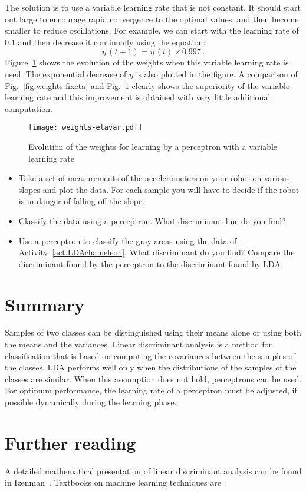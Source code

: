The solution is to use a variable learning rate that is not constant. It should start out large to encourage rapid convergence to the optimal values, and then become smaller to reduce oscillations. For example, we can start with the learning rate of $0.1$ and then decrease it continually using the equation:
\[
\eta\,(t+1) = \eta\,(t) \times 0.997\,.
\]
Figure~\ref{fig.perceptron-dis-etavar} shows the evolution of the weights when this variable learning rate is used. The exponential decrease of $\eta$ is also plotted in the figure. A comparison of Fig.~\ref{fig.weights-fixeta} and Fig.~\ref{fig.perceptron-dis-etavar} clearly shows the superiority of the variable learning rate and this improvement is obtained with very little additional computation.
\begin{figure}
\begin{center}
\texttt{[image: weights-etavar.pdf]}
\end{center}
\caption{Evolution of the weights for learning by a perceptron with a variable learning rate}\label{fig.perceptron-dis-etavar}
\end{figure}

\begin{framed}
\begin{itemize}
\item Take a set of measurements of the accelerometers on your robot on various slopes and plot the data. For each sample you will have to decide if the robot is in danger of falling off the slope.
\item Classify the data using a perceptron. What discriminant line do you find?
\item Use a perceptron to classify the gray areas using the data of Activity~\ref{act.LDAchameleon}. What discriminant do you find? Compare the discriminant found by the perceptron to the discriminant found by LDA.
\end{itemize}
\end{framed}

\section{Summary}

Samples of two classes can be distinguished using their means alone or using both the means and the variances. Linear discriminant analysis is a method for classification that is based on computing the covariances between the samples of the classes. LDA performs well only when the distributions of the samples of the classes are similar. When this assumption does not hold, perceptrons can be used. For optimum performance, the learning rate of a perceptron must be adjusted, if possible dynamically during the learning phase.

\section{Further reading}

A detailed mathematical presentation of linear discriminant analysis can be found in Izenman~\cite[Chapter~8]{izenman2008}. Textbooks on machine learning techniques are \cite{harrington2012machine, kubat2015machinelearning}.



